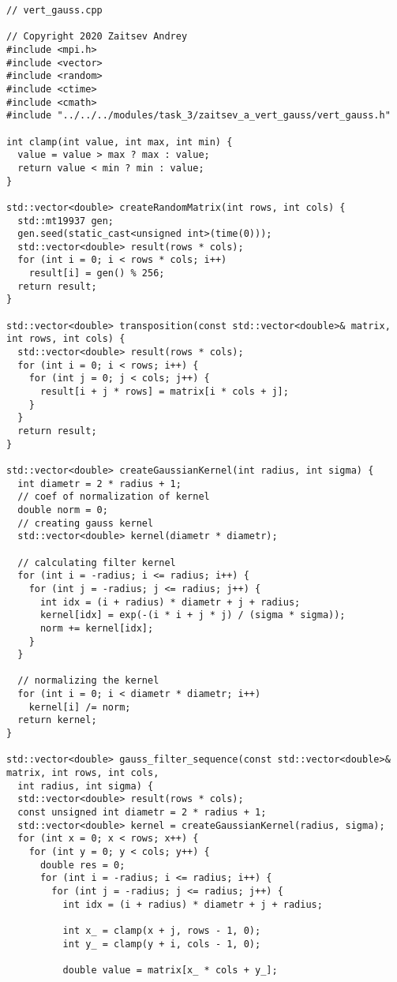 \documentclass{report}
\begin{document}
\begin{lstlisting}
// vert_gauss.cpp

// Copyright 2020 Zaitsev Andrey
#include <mpi.h>
#include <vector>
#include <random>
#include <ctime>
#include <cmath>
#include "../../../modules/task_3/zaitsev_a_vert_gauss/vert_gauss.h"

int clamp(int value, int max, int min) {
  value = value > max ? max : value;
  return value < min ? min : value;
}

std::vector<double> createRandomMatrix(int rows, int cols) {
  std::mt19937 gen;
  gen.seed(static_cast<unsigned int>(time(0)));
  std::vector<double> result(rows * cols);
  for (int i = 0; i < rows * cols; i++)
    result[i] = gen() % 256;
  return result;
}

std::vector<double> transposition(const std::vector<double>& matrix, int rows, int cols) {
  std::vector<double> result(rows * cols);
  for (int i = 0; i < rows; i++) {
    for (int j = 0; j < cols; j++) {
      result[i + j * rows] = matrix[i * cols + j];
    }
  }
  return result;
}

std::vector<double> createGaussianKernel(int radius, int sigma) {
  int diametr = 2 * radius + 1;
  // coef of normalization of kernel
  double norm = 0;
  // creating gauss kernel
  std::vector<double> kernel(diametr * diametr);

  // calculating filter kernel
  for (int i = -radius; i <= radius; i++) {
    for (int j = -radius; j <= radius; j++) {
      int idx = (i + radius) * diametr + j + radius;
      kernel[idx] = exp(-(i * i + j * j) / (sigma * sigma));
      norm += kernel[idx];
    }
  }

  // normalizing the kernel
  for (int i = 0; i < diametr * diametr; i++)
    kernel[i] /= norm;
  return kernel;
}

std::vector<double> gauss_filter_sequence(const std::vector<double>& matrix, int rows, int cols,
  int radius, int sigma) {
  std::vector<double> result(rows * cols);
  const unsigned int diametr = 2 * radius + 1;
  std::vector<double> kernel = createGaussianKernel(radius, sigma);
  for (int x = 0; x < rows; x++) {
    for (int y = 0; y < cols; y++) {
      double res = 0;
      for (int i = -radius; i <= radius; i++) {
        for (int j = -radius; j <= radius; j++) {
          int idx = (i + radius) * diametr + j + radius;

          int x_ = clamp(x + j, rows - 1, 0);
          int y_ = clamp(y + i, cols - 1, 0);

          double value = matrix[x_ * cols + y_];


\end{lstlisting}
\end{document}
